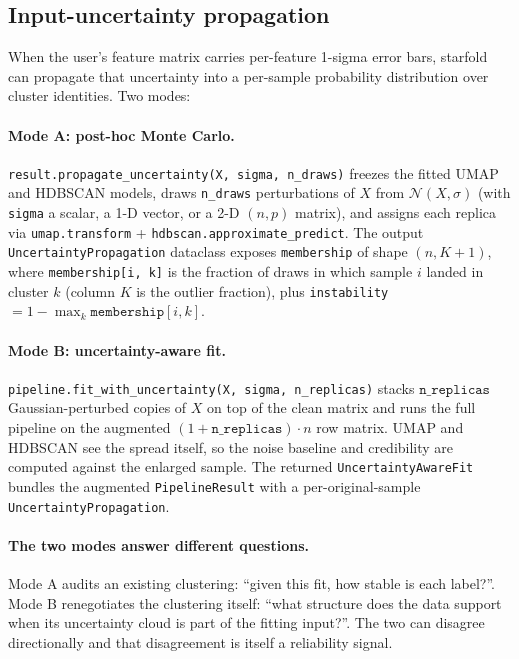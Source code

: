 \documentclass[11pt,a4paper]{article}
\begin{document}
\subsection{Input-uncertainty propagation}
\label{sec:uncertainty}

When the user's feature matrix carries per-feature 1-sigma error bars, \textsf{starfold} can propagate that uncertainty into a per-sample probability distribution over cluster identities. Two modes:

\paragraph{Mode A: post-hoc Monte Carlo.}
\texttt{result.propagate\_uncertainty(X, sigma, n\_draws)} freezes the fitted UMAP and HDBSCAN models, draws \texttt{n\_draws} perturbations of \(X\) from \(\mathcal{N}(X, \sigma)\) (with \texttt{sigma} a scalar, a 1-D vector, or a 2-D \((n, p)\) matrix), and assigns each replica via \texttt{umap.transform} + \texttt{hdbscan.approximate\_predict}. The output \texttt{UncertaintyPropagation} dataclass exposes \texttt{membership} of shape \((n, K + 1)\), where \texttt{membership[i, k]} is the fraction of draws in which sample \(i\) landed in cluster \(k\) (column \(K\) is the outlier fraction), plus \texttt{instability \(= 1 - \max_k \texttt{membership}[i, k]\)}.

\paragraph{Mode B: uncertainty-aware fit.}
\texttt{pipeline.fit\_with\_uncertainty(X, sigma, n\_replicas)} stacks \(\texttt{n\_replicas}\) Gaussian-perturbed copies of \(X\) on top of the clean matrix and runs the full pipeline on the augmented \((1 + \texttt{n\_replicas}) \cdot n\) row matrix. UMAP and HDBSCAN see the spread itself, so the noise baseline and credibility are computed against the enlarged sample. The returned \texttt{UncertaintyAwareFit} bundles the augmented \texttt{PipelineResult} with a per-original-sample \texttt{UncertaintyPropagation}.

\paragraph{The two modes answer different questions.}
Mode A audits an existing clustering: ``given this fit, how stable is each label?''. Mode B renegotiates the clustering itself: ``what structure does the data support when its uncertainty cloud is part of the fitting input?''. The two can disagree directionally and that disagreement is itself a reliability signal.
\end{document}

